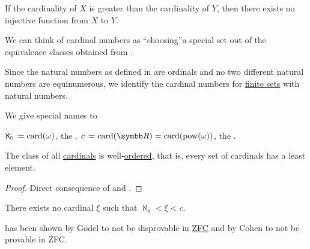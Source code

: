 \begin{corollary}\label{def:pigeonhole_principle}
  If the cardinality of \( X \) is greater than the cardinality of \( Y \), then there exists no injective function from \( X \) to \( Y \).
\end{corollary}

\begin{remark}\label{remark:cardinals}
  We can think of cardinal numbers as \enquote{choosing}\AOC a special set out of the equivalence classes obtained from .

  Since the natural numbers as defined in  are ordinals and no two different natural numbers are equinumerous, we identify the cardinal numbers for \hyperref[def:finite_set]{finite sets} with natural numbers.

  We give special names to
  \begin{RemEnum}
     \( \aleph_0 \coloneqq \operatorname{card}(\omega) \), the .
     \( c \coloneqq \Card(\BR) = \Card(\Pow(\omega)) \), the .
  \end{RemEnum}
\end{remark}

\begin{proposition}\label{thm:cardinals_well_ordered}
  The class of all \hyperref[def:cardinal]{cardinals} is well-\hyperref[def:well_ordered_set]{ordered}, that is, every set of cardinals has a least element.
\end{proposition}
\begin{proof}
  Direct consequence of  and .
\end{proof}

\begin{hypothesis}\label{hyp:continuum_hypothesis}
  There exists no cardinal \( \xi \) such that \( \aleph_0 < \xi < c \).
\end{hypothesis}

\begin{remark}\label{remark:continuum_hypothesis}
   has been shown by G\"odel to not be disprovable in \hyperref[def:set_zfc]{ZFC} and by Cohen to not be provable in ZFC.
\end{remark}

